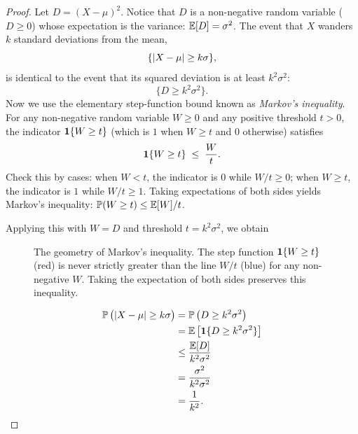 \begin{proof}
Let $D = (X-\mu)^2$. Notice that $D$ is a non-negative random variable ($D \ge 0$)
whose expectation is the variance: $\operatorname{\mathbb{E}}[D] = \sigma^2$. The event that $X$ wanders
$k$ standard deviations from the mean,
\[
  \{\lvert X-\mu\rvert \ge k\sigma\},
\]
is identical to the event that its squared deviation is at least $k^2\sigma^2$:
\[
  \{D \ge k^2\sigma^2\}.
\]
Now we use the elementary step-function bound known as \emph{Markov's inequality}.
For any non-negative random variable $W \ge 0$ and any positive threshold $t > 0$,
the indicator $\mathbf{1}\{W \ge t\}$ (which is $1$ when $W \ge t$ and $0$ otherwise)
satisfies
\[
  \mathbf{1}\{W \ge t\} \;\le\; \frac{W}{t}.
\]
Check this by cases: when $W < t$, the indicator is $0$ while $W/t \ge 0$; when
$W \ge t$, the indicator is $1$ while $W/t \ge 1$. Taking expectations of both
sides yields Markov's inequality: $\operatorname{\mathbb{P}}(W \ge t) \le \operatorname{\mathbb{E}}[W]/t$.

Applying this with $W = D$ and threshold $t = k^2\sigma^2$, we obtain
\begin{figure}[H]
\centering
{}
\caption{The geometry of Markov's inequality. The step function $\mathbf{1}\{W \ge t\}$
(red) is never strictly greater than the line $W/t$ (blue) for any non-negative $W$.
Taking the expectation of both sides preserves this inequality.}
\label{ch09:fig-markov}
\end{figure}
\begin{align*}
  \operatorname{\mathbb{P}}\big(\lvert X-\mu\rvert \ge k\sigma\big)
  &= \operatorname{\mathbb{P}}\big(D \ge k^2\sigma^2\big) \\
  &= \operatorname{\mathbb{E}}\big[\mathbf{1}\{D \ge k^2\sigma^2\}\big] \\
  &\le \frac{\operatorname{\mathbb{E}}[D]}{k^2\sigma^2} \\
  &= \frac{\sigma^2}{k^2\sigma^2} \\
  &= \frac{1}{k^2}. \qedhere
\end{align*}
\end{proof}

